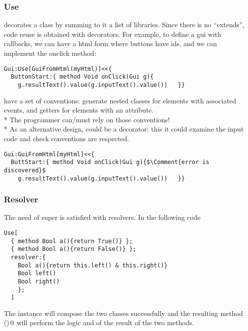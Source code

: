 \begin{frame}[fragile]
\frametitle{Use}
 \Q@Use@ decorates a class by summing to it a list of libraries.
Since there is no ``extends'', code reuse is obtained with decorators.
For example, to define a gui with callbacks, we can have a html form where buttons have ids, and we can implement the onclick method:

\begin{NiceCode}{59ex}{0.8}
\begin{lstlisting}
Gui:Use[GuiFromHtml(myHtml)]<<{
  ButtonStart:{ method Void onClick(Gui g){
    g.resultText().value(g.inputText().value())   }}
\end{lstlisting}
\end{NiceCode}

\Q@GuiFromHtml@ have a set of conventions: generate nested classes for elements with associated events, and getters for elements with an \Q@id@ attribute.\\*
The programmer can/must rely on those conventions!\\*
As an alternative design, \Q@GuiFromHtml@ could be a decorator; this it could examine the input code and check conventions are respected.
\begin{NiceCode}{59ex}{0.8}
\begin{lstlisting}
Gui:GuiFromHtml[myHtml]<<{
  ButtStart:{ method Void onClick(Gui g){$\Comment{error is discovered}$
    g.resultText().value(g.inputText().value())   }}
\end{lstlisting}
\end{NiceCode}
\end{frame}


\begin{frame}[fragile]
\frametitle{Resolver}
The need of super is satisfied with resolvers. In the following code
\begin{NiceCode}{59ex}{0.8}
\begin{lstlisting}
Use[
  { method Bool a(){return True()} };
  { method Bool a(){return False()} };
  resolver:{
    Bool a(){return this.left() & this.right()}
    Bool left()
    Bool right()  
    };
  ]
\end{lstlisting}
\end{NiceCode}
The \Q@Use@ instance will compose the two classes successfully and
the resulting method \Q@a()@ will perform the logic and of the result of the two methods.

\end{frame}


